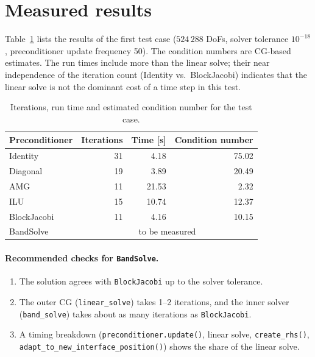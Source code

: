 \documentclass[11pt,a4paper]{article}
\newcommand{\code}[1]{\nolinkurl{#1}}
\newcommand{\param}[1]{\texttt{#1}}
\begin{document}
\section{Measured results}
\label{sec:results}

Table~\ref{tab:results} lists the results of the first test case ($524\,288$ DoFs, solver
tolerance $10^{-18}$, preconditioner update frequency 50). The condition numbers are CG-based
estimates. The run times include more than the linear solve; their near independence of the
iteration count (Identity vs.\ BlockJacobi) indicates that the linear solve is not the dominant cost
of a time step in this test.

\begin{table}[htb]
  \centering
  \caption{Iterations, run time and estimated condition number for the test case.}
  \label{tab:results}
  \begin{tabular}{@{}lrrr@{}}
    \toprule
    Preconditioner & Iterations & Time [s] & Condition number \\
    \midrule
    Identity    & 31 &  4.18 & 75.02 \\
    Diagonal    & 19 &  3.89 & 20.49 \\
    AMG         & 11 & 21.53 &  2.32 \\
    ILU         & 15 & 10.74 & 12.37 \\
    BlockJacobi & 11 &  4.16 & 10.15 \\
    BandSolve   & \multicolumn{3}{c}{to be measured} \\
    \bottomrule
  \end{tabular}
\end{table}

\paragraph{Recommended checks for \param{BandSolve}.}
\begin{enumerate}[leftmargin=*]
  \item The solution agrees with \param{BlockJacobi} up to the solver tolerance.
  \item The outer CG (\code{linear_solve}) takes 1--2 iterations, and the inner solver
        (\code{band_solve}) takes about as many iterations as \param{BlockJacobi}.
  \item A timing breakdown (\code{preconditioner.update()}, linear solve, \code{create_rhs()},
        \code{adapt_to_new_interface_position()}) shows the share of the linear solve.
\end{enumerate}
\end{document}
